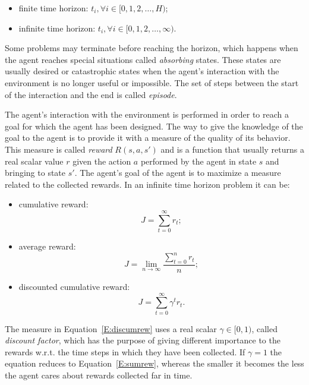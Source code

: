 \begin{itemize}
 \item finite time horizon: $t_i, \forall i \in [0, 1, 2, \dots, H)$;
 \item infinite time horizon: $t_i, \forall i \in [0, 1, 2, \dots, \infty)$.
\end{itemize}
Some problems may terminate before reaching the horizon, which happens when the agent reaches special situations called \textit{absorbing} states. These states are usually desired or catastrophic states when the agent's interaction with the environment is no longer useful or impossible. The set of steps between the start of the interaction and the end is called \textit{episode}.

The agent's interaction with the environment is performed in order to reach a goal for which the agent has been designed. The way to give the knowledge of the goal to the agent is to provide it with a measure of the quality of its behavior. This measure is called \textit{reward} $R(s,a,s')$ and is a function that usually returns a real scalar value $r$ given the action $a$ performed by the agent in state $s$ and bringing to state $s'$. The agent's goal of the agent is to maximize a measure related to the collected rewards. In an infinite time horizon problem it can be:
\begin{itemize}
 \item cumulative reward:
 \begin{equation}\label{E:sumrew}
  J = \sum_{t=0}^\infty r_t;
 \end{equation}
\item average reward:
\begin{equation}
 J = \lim_{n\to\infty}\dfrac{\sum_{t=0}^n r_t}{n};
\end{equation}
\item discounted cumulative reward:
\begin{equation}\label{E:discumrew}
 J = \sum_{t=0}^\infty \gamma^t r_t.
\end{equation}
\end{itemize}
The measure in Equation~\ref{E:discumrew} uses a real scalar $\gamma \in [0, 1)$, called \textit{discount factor}, which has the purpose of giving different importance to the rewards w.r.t. the time steps in which they have been collected. If $\gamma = 1$ the equation reduces to Equation~\ref{E:sumrew}, whereas the smaller it becomes the less the agent cares about rewards collected far in time.

